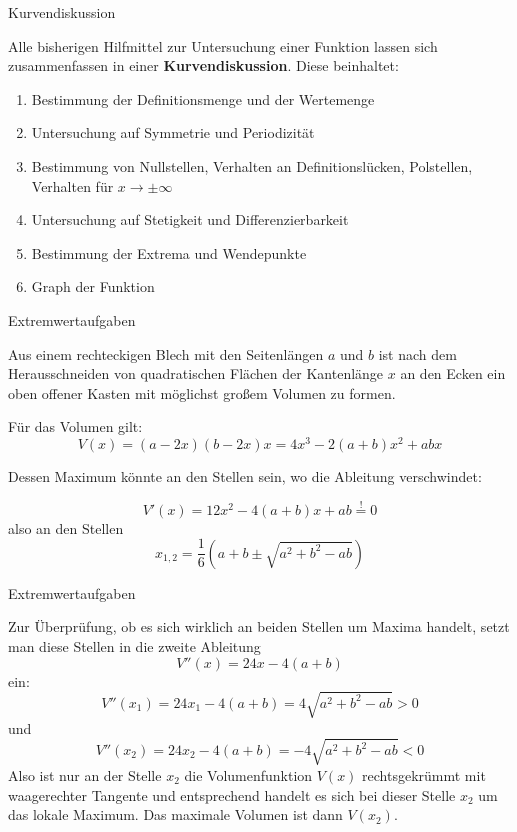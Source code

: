 \begin{frame}{Kurvendiskussion}
	\begin{bemerkung}
		Alle bisherigen Hilfmittel zur Untersuchung einer Funktion lassen sich zusammenfassen in einer \textbf{Kurvendiskussion}. Diese beinhaltet:
		\begin{enumerate}
			\item Bestimmung der Definitionsmenge und der Wertemenge
			\item Untersuchung auf Symmetrie und Periodizität
			\item Bestimmung von Nullstellen, Verhalten an Definitionslücken, Polstellen, Verhalten für $x \to \pm \infty$
			\item Untersuchung auf Stetigkeit und Differenzierbarkeit
			\item Bestimmung der Extrema und Wendepunkte
			\item Graph der Funktion
		\end{enumerate}
	\end{bemerkung}
\end{frame}

\begin{frame}{Extremwertaufgaben}
	\begin{example}
		Aus einem rechteckigen Blech mit den Seitenlängen $a$ und $b$ ist nach dem Herausschneiden von quadratischen Flächen der Kantenlänge $x$ an den Ecken ein oben offener Kasten mit möglichst großem Volumen zu formen.
		
		Für das Volumen gilt:
		\[
		V(x)=\left( a-2x \right) \left( b-2x \right) x = 4x^{3} -2(a+b)x^{2} +abx 
		\]
		
		Dessen Maximum könnte an den Stellen sein, wo die Ableitung verschwindet:
		
		\[
		V'(x)=12x^{2} -4 (a+b)x + ab \overset{!}{=} 0 \]
		also an den Stellen
		\[
		x_{1,2} = \frac{1}{6} \left( a+b\pm \sqrt{a^2+b^2-ab} \right)
		\]
	\end{example}
\end{frame}

\begin{frame}{Extremwertaufgaben}
	\begin{example}
		Zur Überprüfung, ob es sich wirklich an beiden Stellen um Maxima handelt, setzt man diese Stellen in die zweite Ableitung
		\[
			V''(x)=24x-4(a+b)
		\]
		ein:
		\[
		V''(x_{1})= 24 x_{1} -4(a+b) = 4\sqrt{a^2+b^2-ab} > 0
		\]
		und 
		\[
		V''(x_{2})= 24 x_{2} -4(a+b) = - 4\sqrt{a^2+b^2-ab} < 0		
		\]
		Also ist nur an der Stelle $x_{2}$ die Volumenfunktion $V(x)$ rechtsgekrümmt mit waagerechter Tangente und entsprechend handelt es sich bei dieser Stelle $x_{2}$ um das lokale Maximum. Das maximale Volumen ist dann $V(x_{2})$.
	\end{example}
\end{frame} 